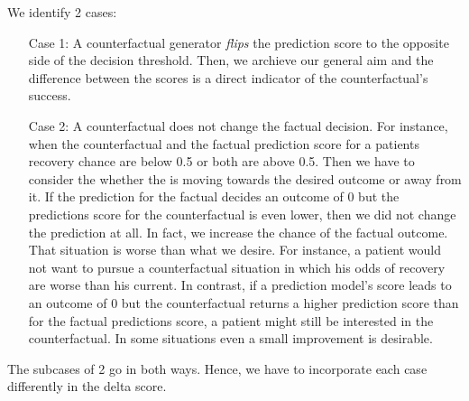 \documentclass[./../../paper.tex]{subfiles}
\begin{document}
We identify 2 cases:
\begin{enumerate}
    \item[Case 1:] A counterfactual generator \emph{flips} the prediction score to the opposite side of the decision threshold. Then, we archieve our general aim and the difference between the scores is a direct indicator of the counterfactual's success.   
    \item[Case 2:] A counterfactual does not change the factual decision. For instance, when the counterfactual and the factual prediction score for a patients recovery chance are below 0.5 or both are above 0.5. Then we have to consider the whether the is moving towards the desired outcome or away from it.
    \subitem[2.1] If the prediction for the factual decides an outcome of 0 but the predictions score for the counterfactual is even lower, then we did not change the prediction at all. In fact, we increase the chance of the factual outcome. That situation is worse than what we desire. For instance, a patient would not want to pursue a counterfactual situation in which his odds of recovery are worse than his current.   
    \subitem[2.2] In contrast, if a prediction model's score leads to an outcome of 0 but the counterfactual returns a higher prediction score than for the factual predictions score, a patient might still be interested in the counterfactual. In some situations even a small improvement is desirable.   
\end{enumerate}

The subcases of 2 go in both ways. Hence, we have to incorporate each case differently in the delta score. 

\end{document}
